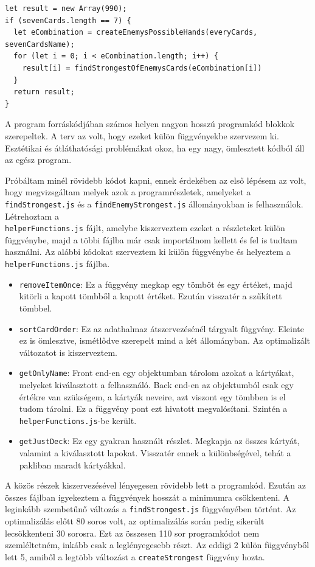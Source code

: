 \begin{lstlisting}[style=htmlcssjs]
let result = new Array(990);
if (sevenCards.length == 7) {
  let eCombination = createEnemysPossibleHands(everyCards, sevenCardsName);
  for (let i = 0; i < eCombination.length; i++) {
    result[i] = findStrongestOfEnemysCards(eCombination[i])
  }
  return result;
}
\end{lstlisting}


A program forráskódjában számos helyen nagyon hosszú programkód blokkok szerepeltek. A terv az volt, hogy ezeket külön függvényekbe szervezem ki. Esztétikai és átláthatósági problémákat okoz, ha egy nagy, ömlesztett kódból áll az egész program.

Próbáltam minél rövidebb kódot kapni, ennek érdekében az első lépésem az volt, hogy megvizsgáltam melyek azok a programrészletek, amelyeket a \texttt{findStrongest.js} és a \texttt{findEnemyStrongest.js} állományokban is felhasználok. Létrehoztam a \\ \texttt{helperFunctions.js} fájlt, amelybe kiszerveztem ezeket a részleteket külön függvénybe, majd a többi fájlba már csak importálnom kellett és fel is tudtam használni. Az alábbi kódokat szerveztem ki külön függvénybe és helyeztem a \texttt{helperFunctions.js} fájlba.
\begin{itemize}
    \item \texttt{removeItemOnce}: Ez a függvény megkap egy tömböt és egy értéket, majd kitörli a kapott tömbből a kapott értéket. Ezután visszatér a szűkített tömbbel.
    \item \texttt{sortCardOrder}: Ez az adathalmaz átszervezésénél tárgyalt függvény. Eleinte ez is ömlesztve, ismétlődve szerepelt mind a két állományban. Az optimalizált változatot is kiszerveztem.
    \item \texttt{getOnlyName}: Front end-en egy objektumban tárolom azokat a kártyákat, melyeket kiválasztott a felhasználó. Back end-en az objektumból csak egy értékre van szükségem, a kártyák neveire, azt viszont egy tömbben is el tudom tárolni. Ez a függvény pont ezt hivatott megvalósítani. Szintén a \texttt{helperFunctions.js}-be került.
    \item \texttt{getJustDeck}: Ez egy gyakran használt részlet. Megkapja az összes kártyát, valamint a kiválasztott lapokat. Visszatér ennek a különbségével, tehát a pakliban maradt kártyákkal.
\end{itemize}

A közös részek kiszervezésével lényegesen rövidebb lett a programkód. Ezután az összes fájlban igyekeztem a függvények hosszát a minimumra csökkenteni. A leginkább szembetűnő változás a \texttt{findStrongest.js} függvényében történt. Az optimalizálás előtt 80 soros volt, az optimalizálás során pedig sikerült lecsökkenteni 30 sorosra. Ezt az összesen 110 sor programkódot nem szemléltetném, inkább csak a leglényegesebb részt. Az eddigi 2 külön függvényből lett 5, amiből a legtöbb változást a \texttt{createStrongest} függvény hozta.

